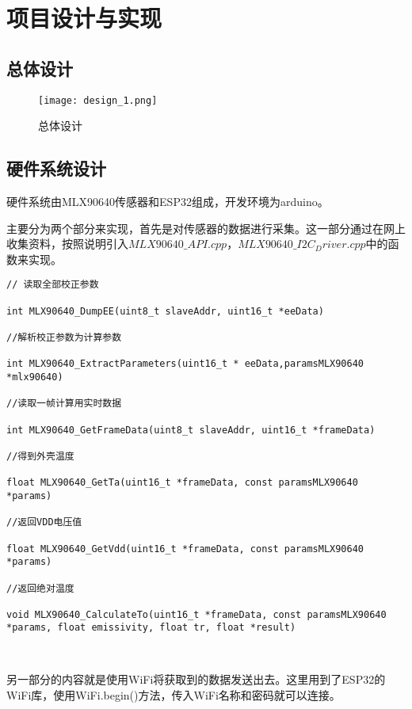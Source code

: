 \chapter{项目设计与实现}
\section{总体设计}
\begin{figure}[htbp]
    \centering
    \texttt{[image: design\_1.png]}
    \caption{总体设计}\label{fig:design_1}
    \vspace{\baselineskip}
    \end{figure}


\section{硬件系统设计}
硬件系统由MLX90640传感器和ESP32组成，开发环境为arduino。

主要分为两个部分来实现，首先是对传感器的数据进行采集。这一部分通过在网上收集资料，按照说明引入$MLX90640\_API.cpp$，$MLX90640\_I2C_Driver.cpp$中的函数来实现。

\begin{lstlisting} 
// 读取全部校正参数
    
int MLX90640_DumpEE(uint8_t slaveAddr, uint16_t *eeData) 
    
//解析校正参数为计算参数
    
int MLX90640_ExtractParameters(uint16_t * eeData,paramsMLX90640 *mlx90640) 
    
//读取一帧计算用实时数据
    
int MLX90640_GetFrameData(uint8_t slaveAddr, uint16_t *frameData) 
    
//得到外壳温度
    
float MLX90640_GetTa(uint16_t *frameData, const paramsMLX90640 *params)
    
//返回VDD电压值
   
float MLX90640_GetVdd(uint16_t *frameData, const paramsMLX90640 *params)
    
//返回绝对温度
   
void MLX90640_CalculateTo(uint16_t *frameData, const paramsMLX90640 *params, float emissivity, float tr, float *result)
    
    
\end{lstlisting}

另一部分的内容就是使用WiFi将获取到的数据发送出去。这里用到了ESP32的WiFi库，使用WiFi.begin()方法，传入WiFi名称和密码就可以连接。

